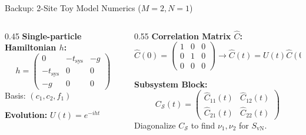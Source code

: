 \documentclass[aspectratio=169,11pt]{beamer}
\begin{document}
\begin{frame}{Backup: 2-Site Toy Model Numerics ($M=2, N=1$)}
    \begin{columns}
        \begin{column}{0.45\textwidth}
            \textbf{Single-particle Hamiltonian $h$:}
            \begin{equation*}
            h = \begin{pmatrix}
            0 & -t_{\mathrm{sys}} & -g \\
            -t_{\mathrm{sys}} & 0 & 0 \\
            -g & 0 & 0
            \end{pmatrix}
            \end{equation*}
            {\footnotesize Basis: $(c_1, c_2, f_1)$}
            
            \vspace{0.3cm}
            \textbf{Evolution:}
            $U(t) = e^{-iht}$
        \end{column}
        \begin{column}{0.55\textwidth}
            \textbf{Correlation Matrix $\hat{C}$:}
            \begin{equation*}
            \hat{C}(0) = \begin{pmatrix}
            1 & 0 & 0 \\
            0 & 1 & 0 \\
            0 & 0 & 0
            \end{pmatrix} \rightarrow \hat{C}(t) = U(t) \hat{C}(0) U^\dagger(t)
            \end{equation*}
            
            \vspace{0.1cm}
            \textbf{Subsystem Block:}
            \begin{equation*}
            C_{\mathcal{S}}(t) = \begin{pmatrix}
            \hat{C}_{11}(t) & \hat{C}_{12}(t) \\
            \hat{C}_{21}(t) & \hat{C}_{22}(t)
            \end{pmatrix}
            \end{equation*}
            {\footnotesize Diagonalize $C_{\mathcal{S}}$ to find $\nu_1, \nu_2$ for $S_{\mathrm{vN}}$.}
        \end{column}
    \end{columns}
\end{frame}
\end{document}

